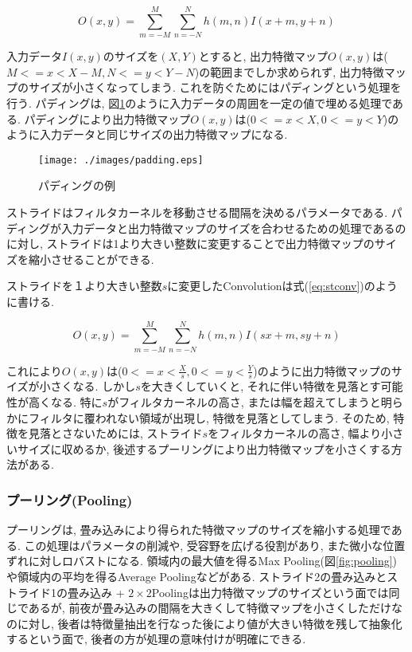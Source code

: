 \begin{equation}
  O(x, y) = \sum_{m=-M}^M \sum_{n=-N}^N h(m,n)I(x+m, y+n) \label{eq:conv1}
\end{equation}

入力データ$I(x, y)$のサイズを$(X, Y)$とすると, 出力特徴マップ$O(x, y)$は($M<=x<X-M, N<=y<Y-N$)の範囲までしか求められず, 出力特徴マップのサイズが小さくなってしまう. これを防ぐためにはパディングという処理を行う. パディングは, 図\ref{fig:padding}のように入力データの周囲を一定の値で埋める処理である. パディングにより出力特徴マップ$O(x, y)$は($0<=x<X, 0<=y<Y$)のように入力データと同じサイズの出力特徴マップになる.  
\begin{figure}[H]
  \centering
  \texttt{[image: ./images/padding.eps]}
  \caption{パディングの例}
  \label{fig:padding}
\end{figure}

ストライドはフィルタカーネルを移動させる間隔を決めるパラメータである. パディングが入力データと出力特徴マップのサイズを合わせるための処理であるのに対し, ストライドは1より大きい整数に変更することで出力特徴マップのサイズを縮小させることができる.  

ストライドを１より大きい整数$s$に変更したConvolutionは式(\ref{eq:stconv})のように書ける.

\begin{equation}
 O(x, y) = \sum_{m=-M}^M \sum_{n=-N}^N h(m,n)I(sx+m, sy+n) \label{eq:stconv}
\end{equation}

これにより$O(x,y)$は($0<=x<\frac{X}{s}, 0<=y<\frac{Y}{s}$)のように出力特徴マップのサイズが小さくなる. しかし$s$を大きくしていくと, それに伴い特徴を見落とす可能性が高くなる. 特に$s$がフィルタカーネルの高さ, または幅を超えてしまうと明らかにフィルタに覆われない領域が出現し, 特徴を見落としてしまう. そのため, 特徴を見落とさないためには, ストライド$s$をフィルタカーネルの高さ, 幅より小さいサイズに収めるか, 後述するプーリングにより出力特徴マップを小さくする方法がある. 



\subsubsection*{プーリング(Pooling)}
プーリングは, 畳み込みにより得られた特徴マップのサイズを縮小する処理である. この処理はパラメータの削減や, 受容野を広げる役割があり, また微小な位置ずれに対しロバストになる. 領域内の最大値を得るMax Pooling(図\ref{fig:pooling})や領域内の平均を得るAverage Poolingなどがある. ストライド2の畳み込みとストライド1の畳み込み + $2\times2$Poolingは出力特徴マップのサイズという面では同じであるが, 前夜が畳み込みの間隔を大きくして特徴マップを小さくしただけなのに対し, 後者は特徴量抽出を行なった後により値が大きい特徴を残して抽象化するという面で, 後者の方が処理の意味付けが明確にできる.

